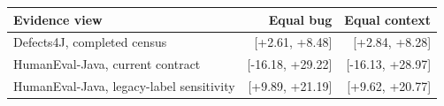 \begin{tabular}{lrr}
\toprule
Evidence view & Equal bug & Equal context \\
\midrule
Defects4J, completed census & [+2.61, +8.48] & [+2.84, +8.28] \\
HumanEval-Java, current contract & [-16.18, +29.22] & [-16.13, +28.97] \\
HumanEval-Java, legacy-label sensitivity & [+9.89, +21.19] & [+9.62, +20.77] \\
\bottomrule
\end{tabular}
